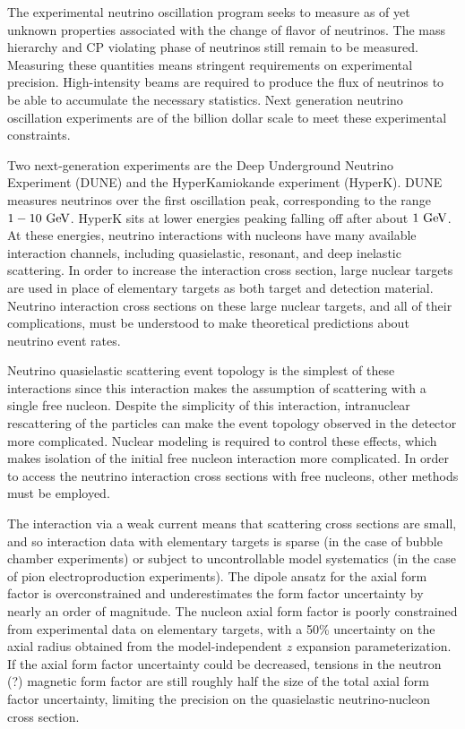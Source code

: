 
The experimental neutrino oscillation program seeks to measure
 as of yet unknown properties associated with the change of flavor of neutrinos.
The mass hierarchy and CP violating phase of neutrinos still remain to be measured.
Measuring these quantities means stringent requirements on experimental precision.
High-intensity beams are required to produce the flux of neutrinos
 to be able to accumulate the necessary statistics.
Next generation neutrino oscillation experiments are of the billion dollar scale
 to meet these experimental constraints.

Two next-generation experiments are the Deep Underground Neutrino Experiment (DUNE)
 and the HyperKamiokande experiment (HyperK).
DUNE measures neutrinos over the first oscillation peak,
 corresponding to the range $1-10~{\rm GeV}$.
HyperK sits at lower energies peaking falling off after about $1~{\rm GeV}$.
At these energies, neutrino interactions with nucleons have many available interaction channels,
 including quasielastic, resonant, and deep inelastic scattering.
In order to increase the interaction cross section,
 large nuclear targets are used in place of elementary targets
 as both target and detection material.
Neutrino interaction cross sections on these large nuclear targets,
 and all of their complications,
 must be understood to make theoretical predictions about neutrino event rates.

Neutrino quasielastic scattering event topology is the simplest of these interactions
 since this interaction makes the assumption of scattering with a single free nucleon.
Despite the simplicity of this interaction,
 intranuclear rescattering of the particles can make the event topology observed
 in the detector more complicated.
Nuclear modeling is required to control these effects,
 which makes isolation of the initial free nucleon interaction more complicated.
In order to access the neutrino interaction cross sections with free nucleons,
 other methods must be employed.

The interaction via a weak current means that scattering cross sections are small,
 and so interaction data with elementary targets is sparse
 (in the case of bubble chamber experiments)
 or subject to uncontrollable model systematics
 (in the case of pion electroproduction experiments).
The dipole ansatz for the axial form factor is overconstrained
 and underestimates the form factor uncertainty by nearly an order of magnitude.
The nucleon axial form factor is poorly constrained from experimental data
 on elementary targets, with a 50\% uncertainty on the axial radius
 obtained from the model-independent $z$ expansion parameterization.
If the axial form factor uncertainty could be decreased,
 tensions in the neutron (?) magnetic form factor are still
 roughly half the size of the total axial form factor uncertainty,
 limiting the precision on the quasielastic neutrino-nucleon cross section.

